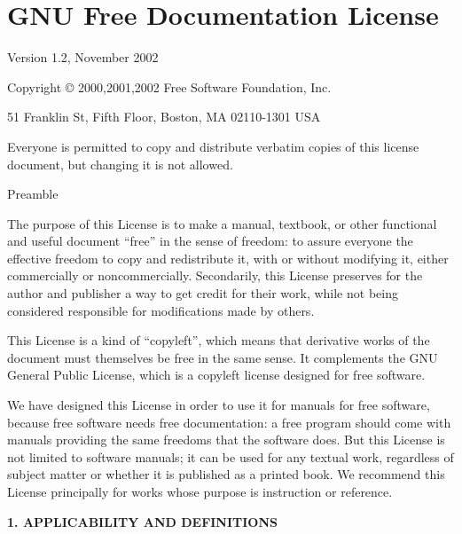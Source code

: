 \chapter{GNU Free Documentation License}

 \begin{center}

       Version 1.2, November 2002


 Copyright \copyright{} 2000,2001,2002  Free Software Foundation, Inc.

 \bigskip

     51 Franklin St, Fifth Floor, Boston, MA  02110-1301  USA

 \bigskip

 Everyone is permitted to copy and distribute verbatim copies
 of this license document, but changing it is not allowed.
\end{center}


\begin{center}
{\textbf \large Preamble}
\end{center}

The purpose of this License is to make a manual, textbook, or other
functional and useful document ``free'' in the sense of freedom: to
assure everyone the effective freedom to copy and redistribute it,
with or without modifying it, either commercially or
noncommercially. Secondarily, this License preserves for the author
and publisher a way to get credit for their work, while not being
considered responsible for modifications made by others.

This License is a kind of ``copyleft'', which means that derivative
works of the document must themselves be free in the same sense.  It
complements the GNU General Public License, which is a copyleft
license designed for free software.

We have designed this License in order to use it for manuals for
free software, because free software needs free documentation: a
free program should come with manuals providing the same freedoms
that the software does.  But this License is not limited to software
manuals; it can be used for any textual work, regardless of subject
matter or whether it is published as a printed book.  We recommend
this License principally for works whose purpose is instruction or
reference.


\begin{center}
{\Large\bfseries  1. APPLICABILITY AND DEFINITIONS\par} 
\end{center}

